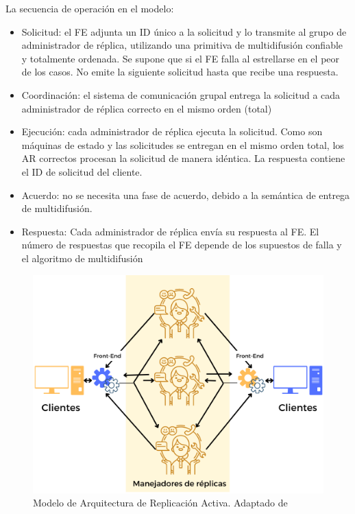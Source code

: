 	 La secuencia de  operación en el modelo:
	 \begin{itemize}
	 	\item  Solicitud: el FE adjunta un ID único a la solicitud y lo transmite al grupo de administrador de réplica, utilizando una primitiva de multidifusión confiable y totalmente ordenada. 
	 	Se supone que si el FE falla al estrellarse en el peor de los casos. No emite la siguiente solicitud hasta que recibe una respuesta. 
	 	\item Coordinación: el sistema de comunicación grupal entrega la solicitud a cada administrador de réplica correcto en el mismo orden (total) 
	 	
	 	\item Ejecución: cada administrador de réplica ejecuta la solicitud. Como son máquinas de estado y las solicitudes se entregan en el mismo orden total, los AR correctos procesan la solicitud de manera idéntica. La respuesta contiene el  ID de solicitud del cliente. 
	 	\item Acuerdo: no se necesita una fase de acuerdo, debido a la semántica de entrega de multidifusión. 
	 	\item Respuesta: Cada administrador de réplica envía su respuesta al FE. El número de respuestas que recopila el FE depende de los supuestos de falla y el algoritmo de multidifusión 
	 \end{itemize}
	 
 \begin{figure}%
 	\includegraphics {9/2.png } 
 	\caption{Modelo de Arquitectura de Replicación Activa. Adaptado de \cite{Coulouris2011} }
 	\label{fig:rep-act}
 \end{figure}
 
